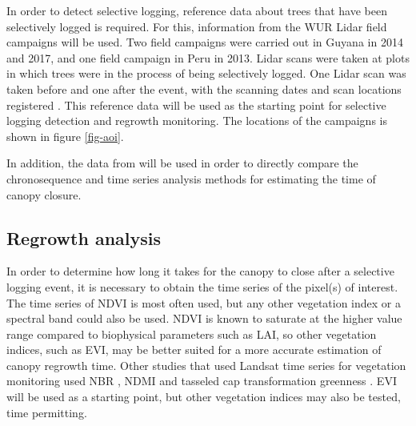 \documentclass[a4paper,10pt]{article}
\begin{document}
In order to detect selective logging, reference data about trees that have been selectively logged is required. For this, information from the \ac{WUR} Lidar field campaigns will be used. Two field campaigns were carried out in Guyana in 2014 and 2017, and one field campaign in Peru in 2013. Lidar scans were taken at plots in which trees were in the process of being selectively logged. One Lidar scan was taken before and one after the event, with the scanning dates and scan locations registered \citep{gonzalez_de_tanago_estimation_2017}. This reference data will be used as the starting point for selective logging detection and regrowth monitoring. The locations of the campaigns is shown in figure \ref{fig-aoi}.

In addition, the data from \citet{broadbent_recovery_2006} will be used in order to directly compare the chronosequence and time series analysis methods for estimating the time of canopy closure.

\subsection{Regrowth analysis}

In order to determine how long it takes for the canopy to close after a selective logging event, it is necessary to obtain the time series of the pixel(s) of interest. The time series of \ac{NDVI} is most often used, but any other vegetation index or a spectral band could also be used. \ac{NDVI} is known to saturate at the higher value range compared to biophysical parameters such as \ac{LAI}, so other vegetation indices, such as \ac{EVI}, may be better suited for a more accurate estimation of canopy regrowth time. Other studies that used Landsat time series for vegetation monitoring used \ac{NBR} \citep{schneibel_assessment_2017, shimizu_using_2017}, \ac{NDMI} \citep{dutrieux_reconstructing_2016} and tasseled cap transformation greenness \citep{powell_quantification_2010}. \ac{EVI} will be used as a starting point, but other vegetation indices may also be tested, time permitting.
\end{document}
